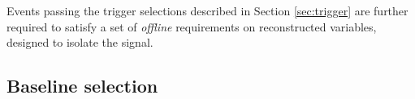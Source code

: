 
Events passing the trigger selections described in Section \ref{sec:trigger} are further required to satisfy a set of \textit{offline} requirements on reconstructed variables, designed to isolate the signal. 

\subsection{Baseline selection}
\label{sec:sel-baseline}

